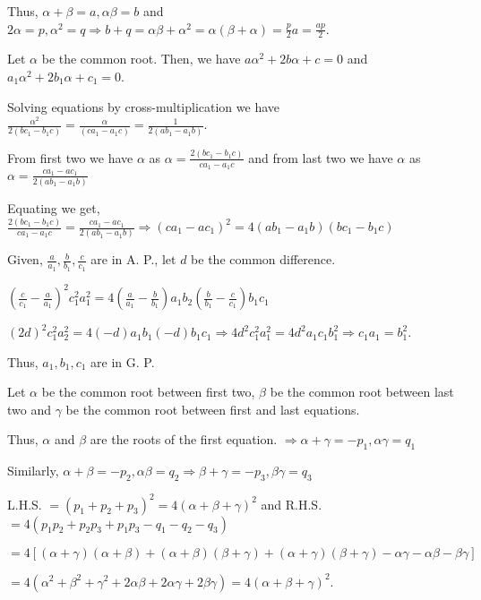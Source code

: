   Thus, $\alpha + \beta = a, \alpha\beta = b$ and $2\alpha = p, \alpha^2 = q\Rightarrow b + q =
  \alpha\beta + \alpha^2 = \alpha(\beta + \alpha) = \frac{p}{2}a = \frac{ap}{2}$.
\item Let $\alpha$ be the common root. Then, we have $a\alpha^2 + 2b\alpha + c = 0$ and $a_1\alpha^2 + 2b_1\alpha + c_1 = 0$.

  Solving equations by cross-multiplication we have $\frac{\alpha^2}{2(bc_1 - b_1c)} = \frac{\alpha}{(ca_1 -
    a_1c)} = \frac{1}{2(ab_1 - a_1b)}$.

  From first two we have $\alpha$ as $\alpha = \frac{2(bc_1 - b_1c)}{ca_1 - a_1c}$ and from last two we have
  $\alpha$ as $\alpha = \frac{ca_1 - ac_1}{2(ab_1 - a_1b)}$

  Equating we get, $\frac{2(bc_1 - b_1c)}{ca_1 - a_1c} = \frac{ca_1 - ac_1}{2(ab_1 - a_1b)}\Rightarrow (ca_1
  - ac_1)^2 = 4(ab_1 - a_1b)(bc_1 - b_1c)$

  Given, $\frac{a}{a_1}, \frac{b}{b_1}, \frac{c}{c_1}$ are in A. P., let $d$ be the common difference.

  $\left(\frac{c}{c_1} - \frac{a}{a_1}\right)^2c_1^2a_1^2 = 4\left(\frac{a}{a_1} -
  \frac{b}{b_1}\right)a_1b_2\left(\frac{b}{b_1} - \frac{c}{c_1}\right)b_1c_1$

  $(2d)^2c_1^2a_2^2 = 4(-d)a_1b_1(-d)b_1c_1\Rightarrow 4d^2c_1^2a_1^2 = 4d^2a_1c_1b_1^2 \Rightarrow c_1a_1 =
  b_1^2$.

  Thus, $a_1, b_1, c_1$ are in G. P.
\item Let $\alpha$ be the common root between first two, $\beta$ be the common root between last two and $\gamma$ be
  the common root between first and last equations.

  Thus, $\alpha$ and $\beta$ are the roots of the first equation. $\Rightarrow \alpha + \gamma = -p_1, \alpha\gamma = q_1$

  Similarly, $\alpha + \beta = -p_2, \alpha\beta = q_2\Rightarrow \beta + \gamma = -p_3, \beta\gamma = q_3$

  L.H.S. $= (p_1 + p_2 + p_3)^2 = 4(\alpha + \beta + \gamma)^2$ and R.H.S. $= 4(p_1p_2 + p_2p_3 + p_1p_3 - q_1 - q_2 - q_3)$

  $= 4[(\alpha + \gamma)(\alpha + \beta) + (\alpha + \beta)(\beta + \gamma) + (\alpha + \gamma)(\beta + \gamma) -
    \alpha\gamma - \alpha\beta - \beta\gamma]$

  $= 4(\alpha^2 + \beta^2 + \gamma^2 + 2\alpha\beta + 2\alpha\gamma + 2\beta\gamma) = 4(\alpha + \beta + \gamma)^2$.

